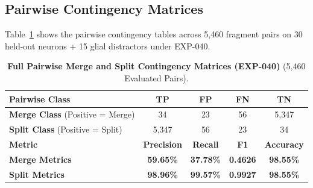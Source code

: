 \documentclass[10pt,twocolumn,letterpaper]{article}
\begin{document}
\subsection{Pairwise Contingency Matrices}
Table~\ref{tab:confusion_matrices} shows the pairwise contingency tables across 5,460 fragment pairs on 30 held-out neurons + 15 glial distractors under EXP-040.

\begin{table}[h]
\centering
\small
\caption{\textbf{Full Pairwise Merge and Split Contingency Matrices (EXP-040)} (5,460 Evaluated Pairs).}
\label{tab:confusion_matrices}
\begin{tabular}{lcccc}
\toprule
\textbf{Pairwise Class} & \textbf{TP} & \textbf{FP} & \textbf{FN} & \textbf{TN} \\
\midrule
\textbf{Merge Class} (Positive = Merge) & 34 & 23 & 56 & 5,347 \\
\textbf{Split Class} (Positive = Split) & 5,347 & 56 & 23 & 34 \\
\midrule
\textbf{Metric} & \textbf{Precision} & \textbf{Recall} & \textbf{F1} & \textbf{Accuracy} \\
\midrule
\textbf{Merge Metrics} & \textbf{59.65\%} & \textbf{37.78\%} & \textbf{0.4626} & \textbf{98.55\%} \\
\textbf{Split Metrics} & \textbf{98.96\%} & \textbf{99.57\%} & \textbf{0.9927} & \textbf{98.55\%} \\
\bottomrule
\end{tabular}
\end{table}
\end{document}

